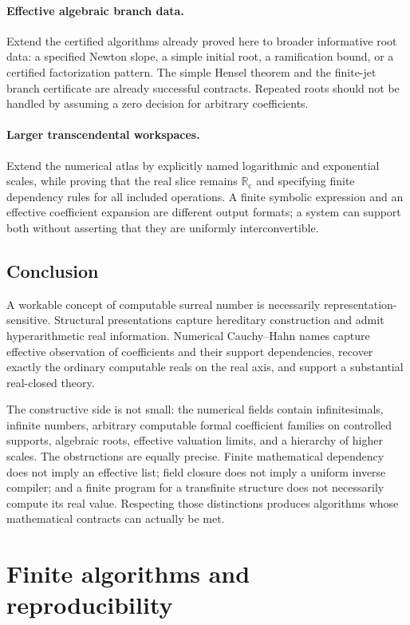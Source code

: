 \documentclass[11pt,letterpaper]{article}
\numberwithin{equation}{section}
\theoremstyle{definition}
\theoremstyle{remark}
\newcommand{\Rc}{\mathbb R_{\mathrm c}}
\begin{document}
\paragraph{Effective algebraic branch data.}
Extend the certified algorithms already proved here to broader informative
root data: a specified Newton slope, a simple initial root, a ramification
bound, or a certified factorization pattern. The simple Hensel theorem and the finite-jet branch certificate are
already successful contracts. Repeated roots should not be handled
by assuming a zero decision for arbitrary coefficients.

\paragraph{Larger transcendental workspaces.}
Extend the numerical atlas by explicitly named logarithmic and exponential
scales, while proving that the real slice remains $\Rc$ and specifying
finite dependency rules for all included operations. A finite symbolic
expression and an effective coefficient expansion are different output
formats; a system can support both without asserting that they are uniformly
interconvertible.

\subsection{Conclusion}

A workable concept of computable surreal number is necessarily
representation-sensitive. Structural presentations capture hereditary
construction and admit hyperarithmetic real information. Numerical
Cauchy--Hahn names capture effective observation of coefficients and their
support dependencies, recover exactly the ordinary computable reals on
the real axis, and support a substantial real-closed theory.

The constructive side is not small: the numerical fields contain
infinitesimals, infinite numbers, arbitrary computable formal coefficient
families on controlled supports, algebraic roots, effective valuation
limits, and a hierarchy of higher scales. The obstructions are equally
precise. Finite mathematical dependency does not imply an effective list;
field closure does not imply a uniform inverse compiler; and a finite
program for a transfinite structure does not necessarily compute its real
value. Respecting those distinctions produces algorithms whose
mathematical contracts can actually be met.

\appendix
\section{Finite algorithms and reproducibility}
\label{app:checks}
\end{document}

